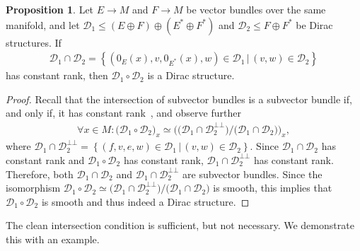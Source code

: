 \documentclass[preprint,12pt]{elsarticle}
\theoremstyle{definition}
\newtheorem{proposition}[theorem]{Proposition}
\newcommand{\bbot}{{\bot\!\!\!\bot}}
\newcommand{\set}[1]{\left\lbrace #1\right\rbrace}
\begin{document}
\begin{proposition}
Let $E\to M$ and $F\to M$ be vector bundles over the same manifold, and let $\mathcal{D}_1\leq (E\oplus F)\oplus(E^*\oplus F^*)$ and $\mathcal{D}_2\leq F\oplus F^*$ be Dirac structures. If
\begin{align}\label{eq:intersection}
\mathcal{D}_1\cap\mathcal{D}_2 = \set{(0_E(x),v,0_{E^*}(x),w)\in\mathcal{D}_1\,\big\vert\,(v,w)\in\mathcal{D}_2}
\end{align}
has constant rank, then $\mathcal{D}_1\circ\mathcal{D}_2$ is a Dirac structure.
\end{proposition}
\begin{proof}
Recall that the intersection of subvector bundles is a subvector bundle if, and only if, it has constant rank~\cite[Theorem 10.34]{Lee13}, and observe further
\begin{align*}
\forall x\in M: \big(\mathcal{D}_1\circ\mathcal{D}_2\big)_x \simeq \big(\big(\mathcal{D}_1\cap\mathcal{D}_2^\bbot\big)/\big(\mathcal{D}_1\cap\mathcal{D}_2\big)\big)_x,
\end{align*}
where $\mathcal{D}_1\cap\mathcal{D}_2^{\bbot} = \set{(f,v,e,w)\in\mathcal{D}_1\,\big\vert\,(v,w)\in\mathcal{D}_2}$. Since $\mathcal{D}_1\cap\mathcal{D}_2$ has constant rank and $\mathcal{D}_1\circ\mathcal{D}_2$ has constant rank, $\mathcal{D}_1\cap\mathcal{D}_2^\bbot$ has constant rank. Therefore, both $\mathcal{D}_1\cap\mathcal{D}_2$ and $\mathcal{D}_1\cap\mathcal{D}_2^\bbot$ are subvector bundles. Since the isomorphism $\mathcal{D}_1\circ\mathcal{D}_2 \simeq \big(\mathcal{D}_1\cap\mathcal{D}_2^\bbot\big)/\big(\mathcal{D}_1\cap\mathcal{D}_2\big)$ is smooth, this implies that $\mathcal{D}_1\circ\mathcal{D}_2$ is smooth and thus indeed a Dirac structure.
\end{proof}

The clean intersection condition is sufficient, but not necessary. We demonstrate this with an example.
\end{document}
